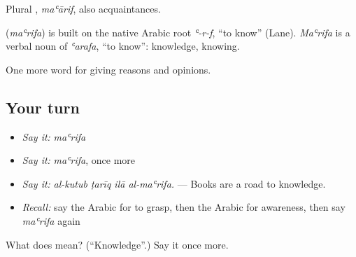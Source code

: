 Plural , \emph{maʿārif}, also acquaintances.

\begin{cousinweb}
\textbf{} (\emph{maʿrifa}) is built on the native Arabic root \emph{ʿ-r-f}, \textquotedblleft{}to know\textquotedblright{} (Lane). \emph{Maʿrifa} is a verbal noun of \emph{ʿarafa}, \textquotedblleft{}to know\textquotedblright{}: knowledge, knowing.
\end{cousinweb}

\begin{grammarlens}[title={What you've built}]
One more word for giving reasons and opinions.
\end{grammarlens}

\subsection*{Your turn}
\begin{itemize}
\raggedright
  \item \emph{Say it:} \emph{maʿrifa}
  \item \emph{Say it:} \emph{maʿrifa}, once more
  \item \emph{Say it:} \emph{al-kutub ṭarīq ilā al-maʿrifa.} — Books are a road to knowledge.
  \item \emph{Recall:} say the Arabic for to grasp, then the Arabic for awareness, then say \emph{maʿrifa} again
\end{itemize}

\begin{tcolorbox}[breakable,colback=teal!4,colframe=teal!35!black,title={Before you move on}]
What does  mean? (\textquotedblleft{}Knowledge\textquotedblright{}.) Say it once more.
\end{tcolorbox}
